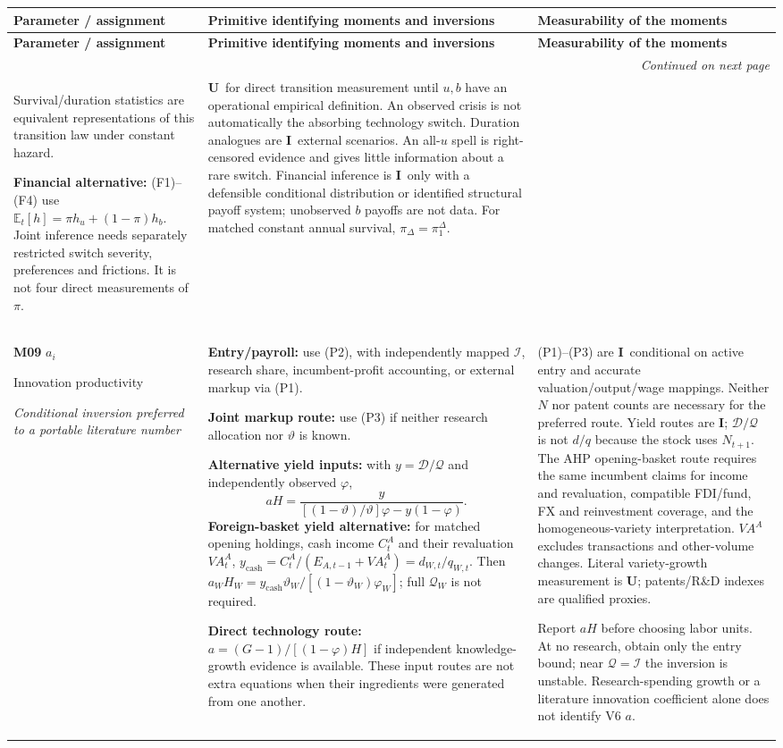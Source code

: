 \documentclass[10pt,a4paper,landscape]{article}
\makeatletter
\newcommand{\E}{\mathbb E_t}
\newcommand{\Q}{\mathcal Q}\newcommand{\I}{\mathcal I}\newcommand{\D}{\mathcal D}
\newcommand{\indirect}{\textbf{I}}
\newcommand{\unavail}{\textbf{U}}
\newcommand{\route}[1]{\par\textit{#1}}
\newenvironment{momenttable}{%
\fontsize{9.5}{11.2}\selectfont\setlength{\parskip}{3pt}
\begin{longtable}{@{}P{\dimexpr .16\textwidth-6.67pt\relax}P{\dimexpr .49\textwidth-6.67pt\relax}P{\dimexpr .35\textwidth-6.66pt\relax}@{}}
\toprule\rowcolor{tablehead}\textbf{Parameter / assignment} & \textbf{Primitive identifying moments and inversions} & \textbf{Measurability of the moments}\\\midrule
\endfirsthead
\toprule\rowcolor{tablehead}\textbf{Parameter / assignment} & \textbf{Primitive identifying moments and inversions} & \textbf{Measurability of the moments}\\\midrule
\endhead
\midrule\multicolumn{3}{r}{\footnotesize\itshape Continued on next page}\\\endfoot
\bottomrule\endlastfoot
}{\end{longtable}}
\makeatother
\begin{document}
\begin{momenttable}
Survival/duration statistics are equivalent representations of this transition law under constant hazard.\par
\textbf{Financial alternative:} (F1)--(F4) use
\(\E[h]=\pi h_u+(1-\pi)h_b\).
Joint inference needs separately restricted switch severity, preferences and frictions. It is not four direct measurements of $\pi$.
& \unavail\ for direct transition measurement until $u,b$ have an operational empirical definition. An observed crisis is not automatically the absorbing technology switch. Duration analogues are \indirect\ external scenarios. An all-$u$ spell is right-censored evidence and gives little information about a rare switch. Financial inference is \indirect\ only with a defensible conditional distribution or identified structural payoff system; unobserved $b$ payoffs are not data. For matched constant annual survival, $\pi_{\Delta}=\pi_{1}^{\Delta}$.\\[7pt]
\textbf{M09} $a_i$\par Innovation productivity\route{Conditional inversion preferred to a portable literature number}
& \textbf{Entry/payroll:} use (P2), with independently mapped $\I$, research share, incumbent-profit accounting, or external markup via (P1).\par
\textbf{Joint markup route:} use (P3) if neither research allocation nor $\vartheta$ is known.\par
\textbf{Alternative yield inputs:} with $y=\D/\Q$ and independently observed $\varphi$,
\[
 aH=\frac{y}{[(1-\vartheta)/\vartheta]\varphi-y(1-\varphi)}.
\]
\textbf{Foreign-basket yield alternative:} for matched opening holdings, cash income $C^A_t$ and their revaluation $VA^A_t$,
\(y_{\mathrm{cash}}=C^A_t/(E_{A,t-1}+VA^A_t)=d_{W,t}/q_{W,t}\).
Then $a_WH_W=y_{\mathrm{cash}}\vartheta_W/[(1-\vartheta_W)\varphi_W]$; full $\Q_W$ is not required.\par
\textbf{Direct technology route:} $a=(G-1)/[(1-\varphi)H]$ if independent knowledge-growth evidence is available. These input routes are not extra equations when their ingredients were generated from one another.
& (P1)--(P3) are \indirect\, conditional on active entry and accurate valuation/output/wage mappings. Neither $N$ nor patent counts are necessary for the preferred route. Yield routes are \indirect; $\D/\Q$ is not $d/q$ because the stock uses $N_{t+1}$. The AHP opening-basket route requires the same incumbent claims for income and revaluation, compatible FDI/fund, FX and reinvestment coverage, and the homogeneous-variety interpretation. $VA^A$ excludes transactions and other-volume changes. Literal variety-growth measurement is \unavail; patents/R\&D indexes are qualified proxies.\par
Report $aH$ before choosing labor units. At no research, obtain only the entry bound; near $\Q=\I$ the inversion is unstable. Research-spending growth or a literature innovation coefficient alone does not identify V6 $a$.\\[3pt]
\end{momenttable}
\end{document}

